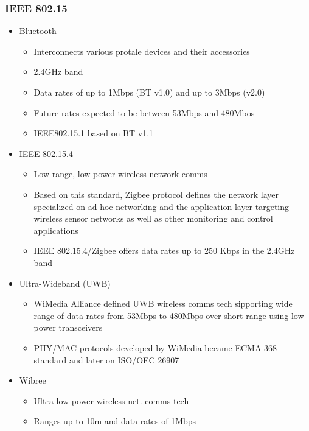 \documentclass[a4paper]{article}
\begin{document}
\subsubsection{IEEE 802.15}
\begin{itemize}
	\item Bluetooth
	\begin{itemize}
		\item Interconnects various protale devices and their
			accessories
		\item 2.4GHz band
		\item Data rates of up to 1Mbps (BT v1.0) and up to 3Mbps (v2.0)
		\item Future rates expected to be between 53Mbps and 480Mbos
		\item IEEE802.15.1 based on BT v1.1
	\end{itemize}
	\item IEEE 802.15.4
	\begin{itemize}
		\item Low-range, low-power wireless network comms
		\item Based on this standard, Zigbee protocol defines the
			network layer specialized on ad-hoc networking and the
			application layer targeting wireless sensor networks as
			well as other monitoring and control applications
		\item IEEE 802.15.4/Zigbee offers data rates up to 250 Kbps in
			the 2.4GHz band
	\end{itemize}
	\item Ultra-Wideband (UWB)
	\begin{itemize}
		\item WiMedia Alliance defined UWB wireless comms tech
			sipporting wide range of data rates from 53Mbps to
			480Mbps over short range using low power transceivers
		\item PHY/MAC protocols developed by WiMedia became ECMA 368
			standard and later on ISO/OEC 26907
	\end{itemize}
	\item Wibree
	\begin{itemize}
		\item Ultra-low power wireless net. comms tech
		\item Ranges up to 10m and data rates of 1Mbps
	\end{itemize}
\end{itemize}
\end{document}
